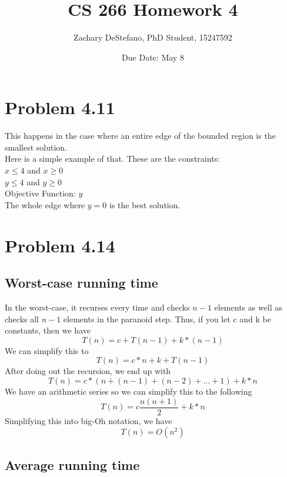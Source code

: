 \documentclass[11pt,psfig]{article}
\begin{document}
\setlength{\parskip}{1.2ex plus0.3ex minus 0.3ex}


\thispagestyle{empty} \pagestyle{myheadings} 



\title{CS 266 Homework 4}
\author{Zachary DeStefano, PhD Student, 15247592}
\date{Due Date: May 8}

\maketitle

\vfill\eject

\section*{Problem 4.11}

This happens in the case where an entire edge of the bounded region is the smallest solution. \\
Here is a simple example of that. These are the constraints: \\
$x \leq 4$ and $x \geq 0$\\
$y \leq 4$ and $y \geq 0$\\
Objective Function: $y$\\
The whole edge where $y=0$ is the best solution. \\

\section*{Problem 4.14}

\subsection*{Worst-case running time}
In the worst-case, it recurses every time and checks $n-1$ elements as well as checks all $n-1$ elements in the paranoid step. Thus, if you let c and k be constants, then we have
\[
T(n) = c + T(n-1) + k*(n-1)
\]
We can simplify this to 
\[
T(n) = c*n + k + T(n-1)
\]
After doing out the recursion, we end up with
\[
T(n) = c*( n + (n-1) + (n-2) + ... + 1 ) + k*n
\]
We have an arithmetic series so we can simplify this to the following
\[
T(n) = c \frac{n(n+1)}{2} + k*n
\]
Simplifying this into big-Oh notation, we have
\[
T(n) = O(n^2)
\]

\newpage

\subsection*{Average running time}
\end{document}
